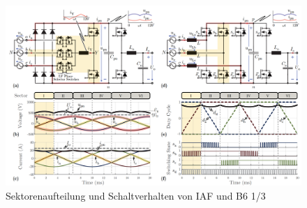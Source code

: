 	\begin{figure}
		\centering
		\includegraphics[width=0.9\linewidth]{content/Grafiken/B6+IAF_Sectors.png}
		\caption{Sektorenaufteilung und Schaltverhalten von IAF und B6 1/3 \cite{13PWMPFC}}
		\label{fig:b6iafsectors}
	\end{figure}

